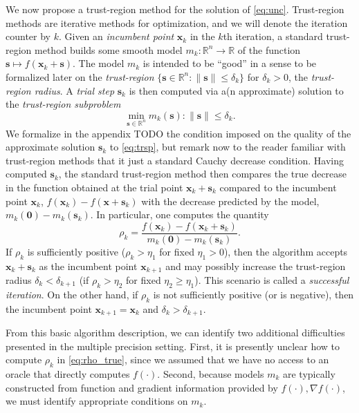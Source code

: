 \documentclass{article}
\newcommand{\xb}{\mathbf{x}}
\newcommand{\sbb}{\mathbf{s}}
\newcommand{\R}{\mathbb{R}}
\newcommand{\dd}{\delta}
\newcommand{\zero}{\mathbf{0}}
\newcommand{\mmnote}[1]{\textsf{{\color{red}{ MM:}   #1}}}
\begin{document}
 We now propose a trust-region method for the solution of \eqref{eq:unc}.
 Trust-region methods are iterative methods for optimization, and we will denote the iteration counter by $k$. 
 Given an \emph{incumbent point} $\xb_k$ in the $k$th iteration, a standard trust-region method builds some smooth model 
 $m_k:  \R^n  \to \R$
 of the function $\sbb \mapsto f(\xb_k+\sbb)$.
 The model $m_k$ is intended to be ``good'' in a sense to be formalized later on the \emph{trust-region}
 $\{\sbb\in\R^n: \|\sbb\|\leq\dd_k\}$ for $\dd_k>0$, the \emph{trust-region radius}. 
 A \emph{trial step} $\sbb_k$ is then computed via a(n approximate) solution to the \emph{trust-region subproblem}
 \begin{equation}
  \label{eq:trsp}
  \displaystyle\min_{\sbb\in\R^n} m_k(\sbb): \|\sbb\|\leq\dd_k.
 \end{equation}
We formalize in the appendix \mmnote{TODO} the condition imposed on the quality of the approximate solution $\sbb_k$ to \eqref{eq:trsp},
but remark now to the reader familiar with trust-region methods that it just a standard Cauchy decrease condition. 
Having computed $\sbb_k$, the standard trust-region method then compares the true decrease in the function obtained at the trial point $\xb_k+\sbb_k$
compared to the incumbent point $\xb_k$, 
$f(\xb_k)-f(\xb+\sbb_k)$ with the decrease predicted by the model,
$m_k(\zero)-m_k(\sbb_k)$. 
In particular, one computes the quantity
\begin{equation}
 \label{eq:rho_true}
 \rho_k=\displaystyle\frac{f(\xb_k)-f(\xb_k+\sbb_k)}{m_k(\zero)-m_k(\sbb_k)}.
\end{equation}
If $\rho_k$ is sufficiently positive ($\rho_k>\eta_1$ for fixed $\eta_1>0$), then the algorithm accepts $\xb_k+\sbb_k$ as the incumbent point $\xb_{k+1}$ and may possibly
increase the trust-region radius $\dd_{k}<\dd_{k+1}$ (if $\rho_k>\eta_2$ for fixed $\eta_2\geq\eta_1$).
This scenario is called a \emph{successful iteration}. 
On the other hand, if $\rho_k$ is not sufficiently positive (or is negative), then the incumbent point $\xb_{k+1}=\xb_k$ 
and $\dd_{k} > \dd_{k+1}$.

From this basic algorithm description, we can identify two additional difficulties presented in the multiple precision setting. 
First, it is presently unclear how to compute $\rho_k$ in \eqref{eq:rho_true}, since we assumed that we have no access to an oracle that directly computes $f(\cdot)$.
Second, because models $m_k$ are typically constructed from function and gradient information provided by $f(\cdot),\nabla f(\cdot)$,
we must identify appropriate conditions on $m_k$.
\end{document}
